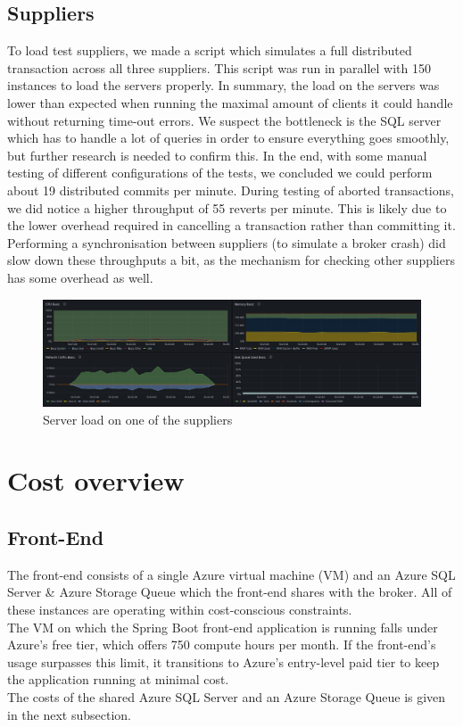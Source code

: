 \documentclass[10pt,a4paper,kul]{kulakarticle} %
\begin{document}
		\subsection{Suppliers}
			To load test suppliers, we made a script which simulates a full distributed transaction across all three suppliers. This script was run in parallel with 150 instances to load the servers properly. In summary, the load on the servers was lower than expected when running the maximal amount of clients it could handle without returning time-out errors. We suspect the bottleneck is the SQL server which has to handle a lot of queries in order to ensure everything goes smoothly, but further research is needed to confirm this. In the end, with some manual testing of different configurations of the tests, we concluded we could perform about 19 distributed commits per minute. During testing of aborted transactions, we did notice a higher throughput of 55 reverts per minute. This is likely due to the lower overhead required in cancelling a transaction rather than committing it. Performing a synchronisation between suppliers (to simulate a broker crash) did slow down these throughputs a bit, as the mechanism for checking other suppliers has some overhead as well. 
			\begin{figure}[h!]
				\centering
				\includegraphics[width=0.9\linewidth]{images/supplier-load}
				\caption{Server load on one of the suppliers}
				\label{fig:supplier_load}
			\end{figure}
			

	\section{Cost overview}
		\subsection{Front-End}
			The front-end consists of a single Azure virtual machine (VM) and an Azure SQL Server \& Azure Storage Queue which the front-end shares with the broker. All of these instances are operating within cost-conscious constraints.\\
			The VM on which the Spring Boot front-end application is running falls under Azure’s free tier, which offers 750 compute hours per month. If the front-end's usage surpasses this limit, it transitions to Azure’s entry-level paid tier to keep the application running at minimal cost. \\
			The costs of the shared Azure SQL Server and an Azure Storage Queue is given in the next subsection.
	
\end{document}
